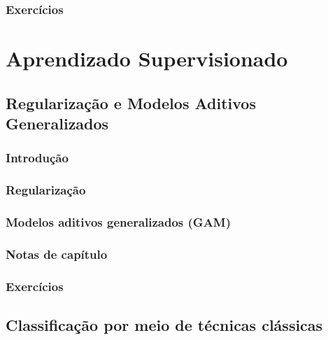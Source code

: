 \documentclass[
]{latex/krantz}
\theoremstyle{definition}
\theoremstyle{definition}
\theoremstyle{definition}
\theoremstyle{definition}
\theoremstyle{remark}
\begin{document}
\hypertarget{exercuxedcios-5}{%
\section{Exercícios}\label{exercuxedcios-5}}

\hypertarget{part-aprendizado-supervisionado}{%
\part{Aprendizado Supervisionado}\label{part-aprendizado-supervisionado}}

\hypertarget{regularizauxe7uxe3o-e-modelos-aditivos-generalizados}{%
\chapter{Regularização e Modelos Aditivos Generalizados}\label{regularizauxe7uxe3o-e-modelos-aditivos-generalizados}}

\hypertarget{introduuxe7uxe3o-6}{%
\section{Introdução}\label{introduuxe7uxe3o-6}}

\hypertarget{regularizauxe7uxe3o}{%
\section{Regularização}\label{regularizauxe7uxe3o}}

\hypertarget{modelos-aditivos-generalizados-gam}{%
\section{Modelos aditivos generalizados (GAM)}\label{modelos-aditivos-generalizados-gam}}

\hypertarget{notas-de-capuxedtulo-6}{%
\section{Notas de capítulo}\label{notas-de-capuxedtulo-6}}

\hypertarget{exercuxedcios-6}{%
\section{Exercícios}\label{exercuxedcios-6}}

\hypertarget{classificauxe7uxe3o-por-meio-de-tuxe9cnicas-cluxe1ssicas}{%
\chapter{Classificação por meio de técnicas clássicas}\label{classificauxe7uxe3o-por-meio-de-tuxe9cnicas-cluxe1ssicas}}
\end{document}
